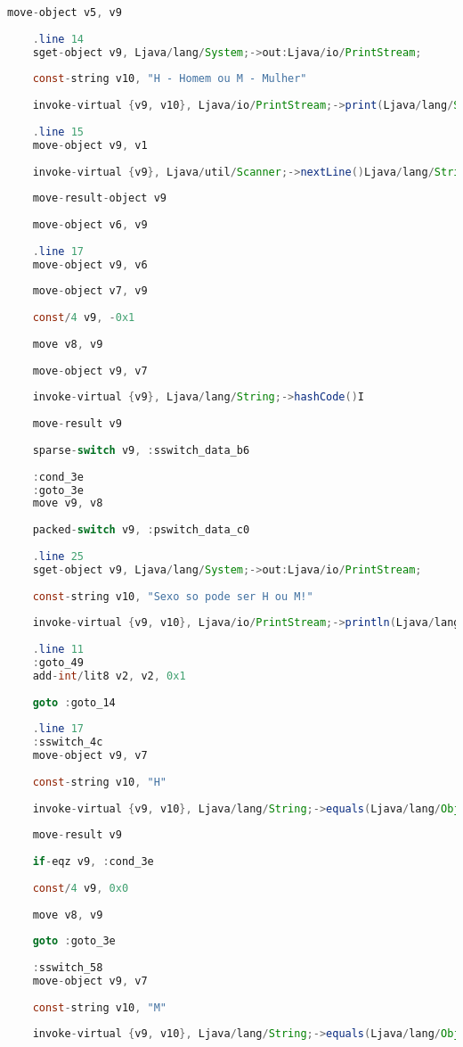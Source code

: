 \documentclass[hidelinks,12pt]{article}
\begin{document}
\begin{lstlisting}[caption=Smali resultante do .java,language=java]
	move-object v5, v9
	
	.line 14
	sget-object v9, Ljava/lang/System;->out:Ljava/io/PrintStream;
	
	const-string v10, "H - Homem ou M - Mulher"
	
	invoke-virtual {v9, v10}, Ljava/io/PrintStream;->print(Ljava/lang/String;)V
	
	.line 15
	move-object v9, v1
	
	invoke-virtual {v9}, Ljava/util/Scanner;->nextLine()Ljava/lang/String;
	
	move-result-object v9
	
	move-object v6, v9
	
	.line 17
	move-object v9, v6
	
	move-object v7, v9
	
	const/4 v9, -0x1
	
	move v8, v9
	
	move-object v9, v7
	
	invoke-virtual {v9}, Ljava/lang/String;->hashCode()I
	
	move-result v9
	
	sparse-switch v9, :sswitch_data_b6
	
	:cond_3e
	:goto_3e
	move v9, v8
	
	packed-switch v9, :pswitch_data_c0
	
	.line 25
	sget-object v9, Ljava/lang/System;->out:Ljava/io/PrintStream;
	
	const-string v10, "Sexo so pode ser H ou M!"
	
	invoke-virtual {v9, v10}, Ljava/io/PrintStream;->println(Ljava/lang/String;)V
	
	.line 11
	:goto_49
	add-int/lit8 v2, v2, 0x1
	
	goto :goto_14
	
	.line 17
	:sswitch_4c
	move-object v9, v7
	
	const-string v10, "H"
	
	invoke-virtual {v9, v10}, Ljava/lang/String;->equals(Ljava/lang/Object;)Z
	
	move-result v9
	
	if-eqz v9, :cond_3e
	
	const/4 v9, 0x0
	
	move v8, v9
	
	goto :goto_3e
	
	:sswitch_58
	move-object v9, v7
	
	const-string v10, "M"
	
	invoke-virtual {v9, v10}, Ljava/lang/String;->equals(Ljava/lang/Object;)Z
	

\end{lstlisting}
\end{document}
